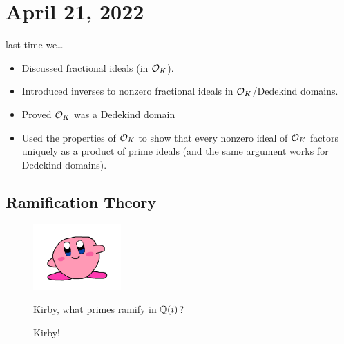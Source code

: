 \section{April 21, 2022}
\recall last time we\dots
\begin{itemize}
    \item Discussed fractional ideals (in $\mathcal{O}_K$).
    \item Introduced inverses to nonzero fractional ideals in $\mathcal{O}_K$/Dedekind domains.
    \item Proved $\mathcal{O}_K$ was a Dedekind domain
    \item Used the properties of $\mathcal{O}_K$ to show that every nonzero ideal of $\mathcal{O}_K$ factors uniquely as a product of prime ideals (and the same argument works for Dedekind domains).
\end{itemize}

\subsection{Ramification Theory}
\begin{figure}[ht!]
    \begin{center}
        \includegraphics[width=0.3\textwidth]{images/kirby.png}
    \end{center}
    \caption{Kirby!}
    \begin{ques*}
        Kirby, what primes \ul{ramify} in $\mathbb Q(i)$?
    \end{ques*}
\end{figure}

